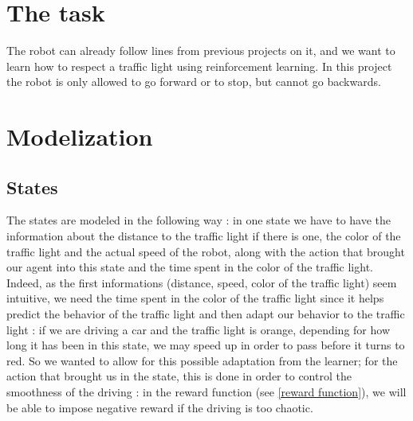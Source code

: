 \documentclass[14pt,a4paper]{article}
\theoremstyle{definition}
\begin{document}
\section{The task}
The robot can already follow lines from previous projects on it, and we want to learn how to respect a traffic light using reinforcement learning. In this project the robot is only allowed to go forward or to stop, but cannot go backwards.

\section{Modelization}

\subsection{States}
The states are modeled in the following way : in one state we have to have the information about the distance to the traffic light if there is one, the color of the traffic light and the actual speed of the robot, along with the action that brought our agent into this state and the time spent in the color of the traffic light. Indeed, as the first informations (distance, speed, color of the traffic light) seem intuitive, we need the time spent in the color of the traffic light since it helps predict the behavior of the traffic light and then adapt our behavior to the traffic light : if we are driving a car and the traffic light is orange, depending for how long it has been in this state, we may speed up in order to pass before it turns to red. So we wanted to allow for this possible adaptation from the learner; for the action that brought us in the state, this is done in order to control the smoothness of the driving : in the reward function (see \ref{reward function}), we will be able to impose negative reward if the driving is too chaotic.
\end{document}
